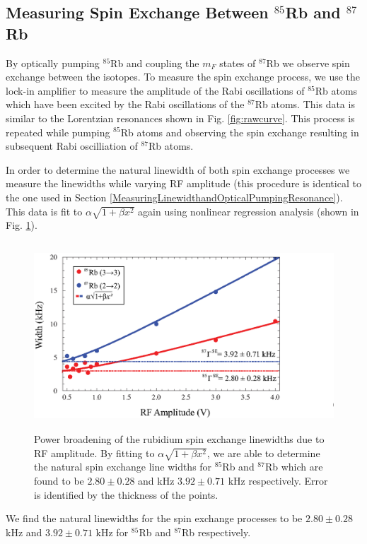 \subsection{Measuring Spin Exchange Between $^{85}$Rb and $^{87}$Rb}\label{MeasuringSpinExchange}
By optically pumping $^{85}$Rb and coupling the $m_F$ states of $^{87}$Rb we observe spin exchange between the isotopes. To measure the spin exchange process, we use the lock-in amplifier to measure the amplitude of the Rabi oscillations of $^{85}$Rb atoms which have been excited by the Rabi oscillations of the $^{87}$Rb atoms.  This data is similar to the Lorentzian resonances shown in Fig. \ref{fig:rawcurve}.  This process is repeated while pumping $^{85}$Rb atoms and observing the spin exchange resulting in subsequent Rabi oscilliation of $^{87}$Rb atoms.

In order to determine the natural linewidth of both spin exchange processes we measure the linewidths while varying RF amplitude (this procedure is identical to the one used in Section \ref{MeasuringLinewidthandOpticalPumpingResonance}).  This data is fit to $\alpha \sqrt{1+\beta x^2}$ again using nonlinear regression analysis (shown in Fig. \ref{fig: spinexchange}).
\begin{figure}[htbp]
\begin{center}
\includegraphics[height=70mm]{./figures/spin_exchange.eps}
\caption{\small{Power broadening of the rubidium spin exchange linewidths due to RF amplitude. By fitting to $\alpha \sqrt{1+\beta x^2}$, we are able to determine the natural spin exchange line widths for $^{85}$Rb and $^{87}$Rb which are found to be $2.80 \pm 0.28$ and kHz $3.92 \pm 0.71$ kHz respectively.  Error is identified by the thickness of the points.}}\label{fig: spinexchange}
\end{center}
\end{figure}
We find the natural linewidths for the spin exchange processes to be $2.80 \pm 0.28$ kHz and $3.92 \pm 0.71$ kHz for $^{85}$Rb and $^{87}$Rb respectively.